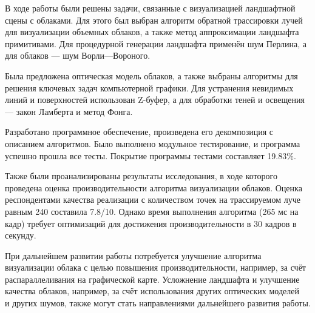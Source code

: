 
В ходе работы были решены задачи, связанные с визуализацией ландшафтной сцены с облаками. Для этого был выбран алгоритм обратной трассировки лучей для визуализации объемных облаков, а также метод аппроксимации ландшафта примитивами. Для процедурной генерации ландшафта применён шум Перлина, а для облаков — шум Ворли--–Вороного.

Была предложена оптическая модель облаков, а также выбраны алгоритмы для решения ключевых задач компьютерной графики. Для устранения невидимых линий и поверхностей использован Z-буфер, а для обработки теней и освещения — закон Ламберта и метод Фонга.

Разработано программное обеспечение, произведена его декомпозиция с описанием алгоритмов. Было выполнено модульное тестирование, и программа успешно прошла все тесты. Покрытие программы тестами составляет 19.83\%.

Также были проанализированы результаты исследования, в ходе которого проведена оценка производительности алгоритма визуализации облаков. Оценка респондентами качества реализации с количеством точек на трассируемом луче равным 240 составила 7.8/10. Однако время выполнения алгоритма (265 мс на кадр) требует оптимизаций для достижения производительности в 30 кадров в секунду.

При дальнейшем развитии работы потребуется улучшение алгоритма визуализации облака с целью повышения производительности, например, за счёт распараллеливания на графической карте. Усложнение ландшафта и улучшение качества облаков, например, за счёт использования других оптических моделей~\cite{guerrilla_volumetric_cloudscapes_2023} и других шумов, также могут стать направлениями дальнейшего развития работы.